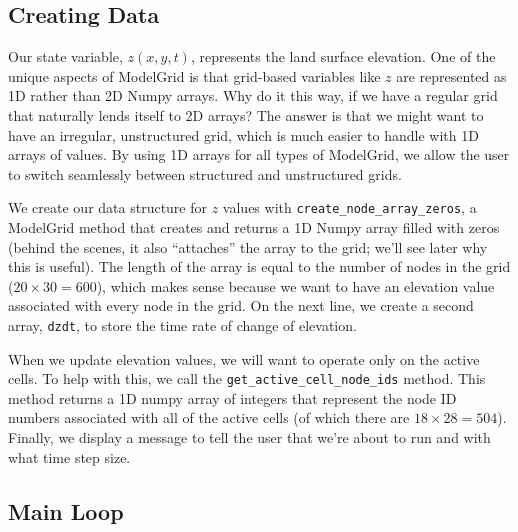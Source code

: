 \documentclass[12pt]{article}
\newcommand{\code}[1]{{\tt #1}}
\begin{document}
\subsection{Creating Data}



Our state variable, $z(x,y,t)$, represents the land surface elevation. One of the unique aspects of ModelGrid is that grid-based variables like $z$ are represented as 1D rather than 2D Numpy arrays. Why do it this way, if we have a regular grid that naturally lends itself to 2D arrays? The answer is that we might want to have an irregular, unstructured grid, which is much easier to handle with 1D arrays of values. By using 1D arrays for all types of ModelGrid, we allow the user to switch seamlessly between structured and unstructured grids.

We create our data structure for $z$ values with  \code{create\_node\_array\_zeros}, a ModelGrid method that creates and returns a 1D Numpy array filled with zeros (behind the scenes, it also ``attaches'' the array to the grid; we'll see later why this is useful). The length of the array is equal to the number of nodes in the grid ($20\times 30=600$), which makes sense because we want to have an elevation value associated with every node in the grid.
On the next line, we create a second array, \code{dzdt}, to store the time rate of change of elevation. 

When we update elevation values, we will want to operate only on the active cells. To help with this, we call the \code{get\_active\_cell\_node\_ids} method. This method returns a 1D numpy array of integers that represent the node ID numbers associated with all of the active cells (of which there are $18\times 28 = 504$). Finally, we display a message to tell the user that we're about to run and with what time step size.


\subsection{Main Loop}
\end{document}
